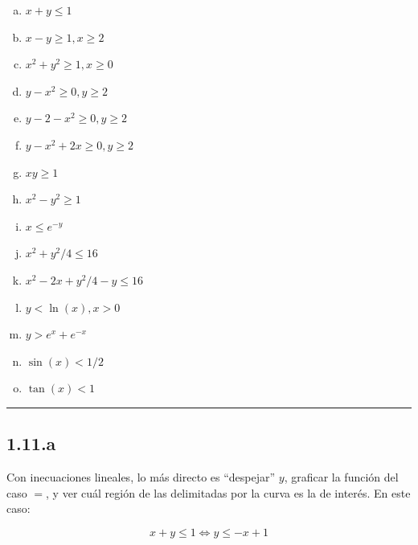 \documentclass{article}
\begin{document}
\begin{enumerate}[(a)]
\bfseries
\item $x + y \leq 1$

\item $x - y \geq 1, x \geq 2$

\item $x^2 + y^2 \geq 1, x \geq 0$

\item $y - x^2 \geq 0, y \geq 2$

\item $y - 2 - x^2 \geq 0, y \geq 2$

\item $y - x^2 + 2x \geq 0, y \geq 2$

\item $x y \geq 1$

\item $x^2 - y^2 \geq 1$

\item $x \leq e^{-y}$

\item $x^2 + y^2/4 \leq 16$

\item $x^2 - 2x + y^2/4 - y \leq 16$

\item $y < \ln(x), x > 0$

\item $y > e^x + e^{-x}$

\item $\sin(x) < 1/2$

\item $\tan(x) < 1$
\end{enumerate}
\hrule

\subsection*{1.11.a}
\label{subsec:1.11.a}

Con inecuaciones lineales, lo más directo es ``despejar'' $y$, graficar la función del caso $=$, y ver cuál región de las delimitadas por la curva es la de interés. En este caso:

\begin{equation}
x + y \leq 1 \Leftrightarrow y \leq -x + 1
\end{equation}
\end{document}
